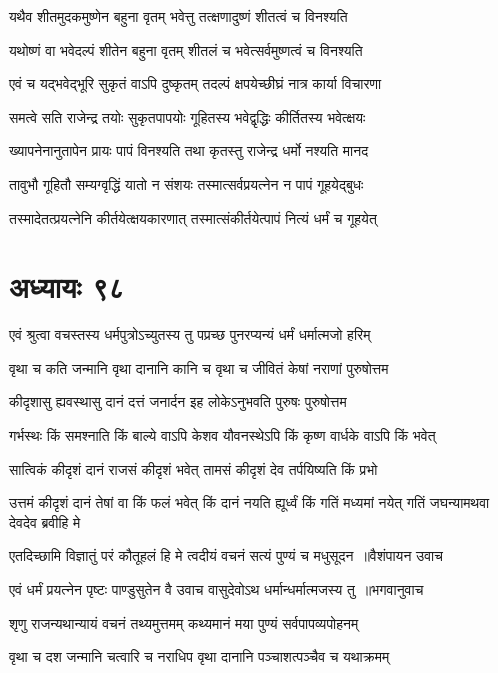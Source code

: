 \twolineshloka
{यथैव शीतमुदकमुष्णेन बहुना वृतम्}
{भवेत्तु तत्क्षणादुष्णं शीतत्वं च विनश्यति}


\twolineshloka
{यथोष्णं वा भवेदल्पं शीतेन बहुना वृतम्}
{शीतलं च भवेत्सर्वमुष्णत्वं च विनश्यति}


\twolineshloka
{एवं च यद्भवेद्भूरि सुकृतं वाऽपि दुष्कृतम्}
{तदल्पं क्षपयेच्छीघ्रं नात्र कार्या विचारणा}


\twolineshloka
{समत्वे सति राजेन्द्र तयोः सुकृतपापयोः}
{गूहितस्य भवेद्वृद्धिः कीर्तितस्य भवेत्क्षयः}


\twolineshloka
{ख्यापनेनानुतापेन प्रायः पापं विनश्यति}
{तथा कृतस्तु राजेन्द्र धर्मो नश्यति मानद}


\twolineshloka
{तावुभौ गूहितौ सम्यग्वृद्धिं यातो न संशयः}
{तस्मात्सर्वप्रयत्नेन न पापं गूहयेद्बुधः}


\twolineshloka
{तस्मादेतत्प्रयत्नेनि कीर्तयेत्क्षयकारणात्}
{तस्मात्संकीर्तयेत्पापं नित्यं धर्मं च गूहयेत्}


\chapter{अध्यायः ९८}
\twolineshloka
{एवं श्रुत्वा वचस्तस्य धर्मपुत्रोऽच्युतस्य तु}
{पप्रच्छ पुनरप्यन्यं धर्मं धर्मात्मजो हरिम्}


\twolineshloka
{वृथा च कति जन्मानि वृथा दानानि कानि च}
{वृथा च जीवितं केषां नराणां पुरुषोत्तम}


\twolineshloka
{कीदृशासु ह्यवस्थासु दानं दत्तं जनार्दन}
{इह लोकेऽनुभवति पुरुषः पुरुषोत्तम}


\twolineshloka
{गर्भस्थः किं समश्नाति किं बाल्ये वाऽपि केशव}
{यौवनस्थेऽपि किं कृष्ण वार्धके वाऽपि किं भवेत्}


\twolineshloka
{सात्विकं कीदृशं दानं राजसं कीदृशं भवेत्}
{तामसं कीदृशं देव तर्पयिष्यति किं प्रभो}


\threelineshloka
{उत्तमं कीदृशं दानं तेषां वा किं फलं भवेत्}
{किं दानं नयति ह्यूर्ध्वं किं गतिं मध्यमां नयेत्}
{गतिं जघन्यामथवा देवदेव ब्रवीहि मे}


\threelineshloka
{एतदिच्छामि विज्ञातुं परं कौतूहलं हि मे}
{त्वदीयं वचनं सत्यं पुण्यं च मधुसूदन ॥वैशंपायन उवाच}
{}


\threelineshloka
{एवं धर्मं प्रयत्नेन पृष्टः पाण्डुसुतेन वै}
{उवाच वासुदेवोऽथ धर्मान्धर्मात्मजस्य तु ॥भगवानुवाच}
{}


\twolineshloka
{शृणु राजन्यथान्यायं वचनं तथ्यमुत्तमम्}
{कथ्यमानं मया पुण्यं सर्वपापव्यपोहनम्}


\twolineshloka
{वृथा च दश जन्मानि चत्वारि च नराधिप}
{वृथा दानानि पञ्चाशत्पञ्चैव च यथाक्रमम्}



